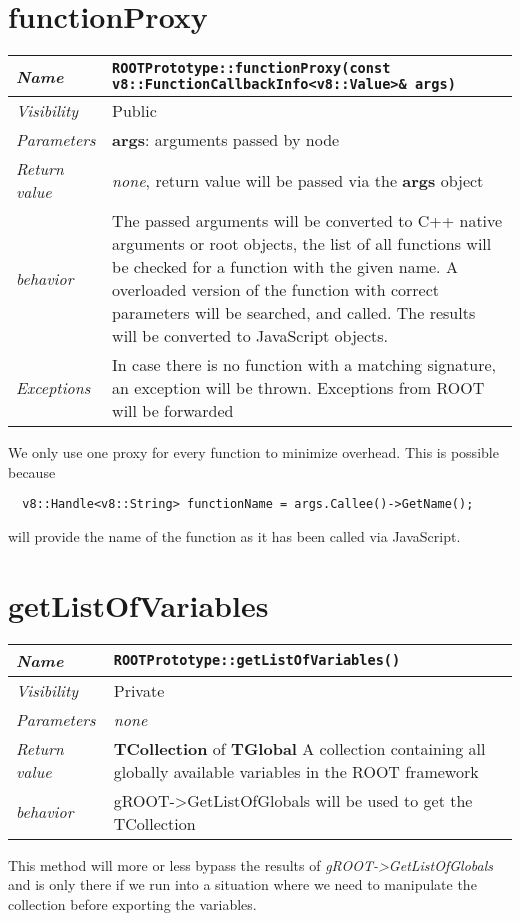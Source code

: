 \section{functionProxy}
\begin{longtable}{p{3cm} @{\hskip 1cm} p{12cm}}
  \hline
  \textit{Name} & \texttt{ROOTPrototype::functionProxy(const v8::FunctionCallbackInfo<v8::Value>\& args)} \\
  \hline
  \textit{Visibility} & Public \\
  \hline
  \textit{Parameters} & \textbf{args}: arguments passed by node \\
  \hline
  \textit{Return value} & \textit{none}, return value will be passed via the \textbf{args} object \\
  \hline
  \textit{behavior} & The passed arguments will be converted to C++ native arguments or root objects, the list of all functions will be checked for a function with the given name.
  A overloaded version of the function with correct parameters will be searched, and called. The results will be converted to JavaScript objects. \\
  \hline
  \textit{Exceptions} & In case there is no function with a matching signature, an exception will be thrown.
  Exceptions from ROOT will be forwarded
  \hline
\end{longtable}
We only use one proxy for every function to minimize overhead. This is possible because
\begin{verbatim}
  v8::Handle<v8::String> functionName = args.Callee()->GetName();
\end{verbatim}
will provide the name of the function as it has been called via JavaScript.
\newpage
\section{getListOfVariables}
\begin{longtable}{p{3cm} @{\hskip 1cm} p{12cm}}
  \hline
  \textit{Name} & \texttt{ROOTPrototype::getListOfVariables()} \\
  \hline
  \textit{Visibility} & Private \\
  \hline
  \textit{Parameters} & \textit{none} \\
  \hline
  \textit{Return value} & \textbf{TCollection} of \textbf{TGlobal} A collection containing all globally available variables in the ROOT framework \\
  \hline
  \textit{behavior} & gROOT->GetListOfGlobals will be used to get the TCollection \\
  \hline
\end{longtable}
This method will more or less bypass the results of \textit{gROOT->GetListOfGlobals} and is only there if we run into a situation where we need to manipulate the collection before exporting the variables.
\newpage
